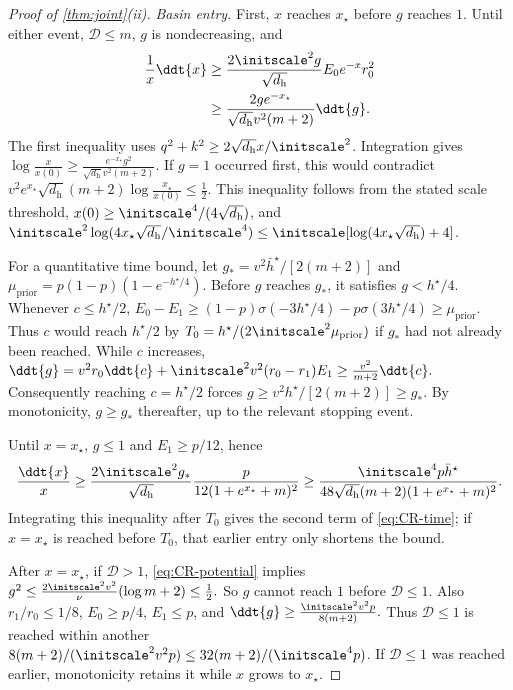 \begin{proof}[Proof of \cref{thm:joint}(ii)]
\emph{Basin entry.}
First, $x$ reaches $x_\star$ before $g$ reaches $1$. Until either event, $\mathcal D\le m$, $g$ is nondecreasing, and
\begin{align*}
 \frac1x\ddt{x}&\ge\frac{2\initscale^2g}{\sqrt{d_{\mathrm h}}}E_0e^{-x}r_0^2\\
 &\ge\frac{2ge^{-x_\star}}{\sqrt{d_{\mathrm h}}v^2(m+2)}\ddt{g}.
\end{align*} 
The first inequality uses $q^2+k^2\ge2\sqrt{d_{\mathrm h}}x/\initscale^2$.
Integration gives
 $\log\frac{x}{x(0)}\ge\frac{e^{-x_\star}g^2}{\sqrt{d_{\mathrm h}}v^2(m+2)}.$ 
If $g=1$ occurred first, this would contradict
 $v^2e^{x_\star}\sqrt{d_{\mathrm h}}(m+2)\log\frac{x_\star}{x(0)}\le\frac12.$ 
This inequality follows from the stated scale threshold, $x(0)\ge\initscale^4/(4\sqrt{d_{\mathrm h}})$, and
$\initscale^2\log(4x_\star\sqrt{d_{\mathrm h}}/\initscale^4)\le\initscale[\log(4x_\star\sqrt{d_{\mathrm h}})+4]$.

For a quantitative time bound, let $g_*=v^2\bar h^\star/[2(m+2)]$ and
$\mu_{\mathrm{prior}}=p(1-p)(1-e^{-h^\star/4})$.
Before $g$ reaches $g_*$, it satisfies $g<h^\star/4$. Whenever $c\le h^\star/2$,
 $E_0-E_1\ge(1-p)\sigma(-3h^\star/4)-p\sigma(3h^\star/4)\ge\mu_{\mathrm{prior}}.$ 
Thus $c$ would reach $h^\star/2$ by $T_0=h^\star/(2\initscale^2\mu_{\mathrm{prior}})$ if $g_*$ had not already been reached.
While $c$ increases,
 $\ddt{g}=v^2r_0\ddt{c}+\initscale^2v^2(r_0-r_1)E_1\ge\frac{v^2}{m+2}\ddt{c}.$ 
Consequently reaching $c=h^\star/2$ forces $g\ge v^2h^\star/[2(m+2)]\ge g_*$.
By monotonicity, $g\ge g_*$ thereafter, up to the relevant stopping event.

Until $x=x_\star$, $g\le1$ and $E_1\ge p/12$, hence
\[
 \frac{\ddt{x}}{x}\ge\frac{2\initscale^2g_*}{\sqrt{d_{\mathrm h}}}
       \frac{p}{12(1+e^{x_\star}+m)^2}
 \ge\frac{\initscale^4p\bar h^\star}{48\sqrt{d_{\mathrm h}}(m+2)(1+e^{x_\star}+m)^2}.
\]
Integrating this inequality after $T_0$ gives the second term of \cref{eq:CR-time}; if $x=x_\star$ is reached before $T_0$,
that earlier entry only shortens the bound.

After $x=x_\star$, if $\mathcal D>1$, \eqref{eq:CR-potential} implies
 $g^2\le\frac{2\initscale^2v^2}{\nu}(\log m+2)\le\frac12.$ 
So $g$ cannot reach $1$ before $\mathcal D\le1$. Also $r_1/r_0\le1/8$, $E_0\ge p/4$, $E_1\le p$, and
 $\ddt{g}\ge\frac{\initscale^2v^2 p}{8(m+2)}.$ 
Thus $\mathcal D\le1$ is reached within another $8(m+2)/(\initscale^2v^2 p)\le32(m+2)/(\initscale^4p)$.
If $\mathcal D\le1$ was reached earlier, monotonicity retains it while $x$ grows to $x_\star$.


\end{proof}
